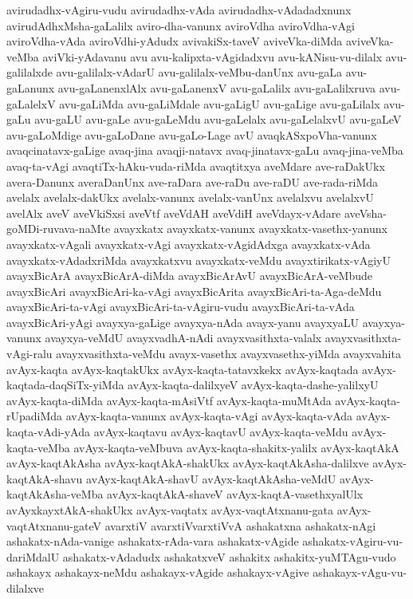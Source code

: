 {avirudadhx-vAgiru-vudu
avirudadhx-vAda
avirudadhx-vAdadadxnunx
avirudAdhxMsha-gaLalilx
aviro-dha-vanunx
aviroVdha
aviroVdha-vAgi
aviroVdha-vAda
aviroVdhi-yAdudx
avivakiSx-taveV
aviveVka-diMda
aviveVka-veMba
aviVki-yAdavanu
avu
avu-kalipxta-vAgidadxvu
avu-kANisu-vu-dilalx
avu-galilalxde
avu-galilalx-vAdarU
avu-galilalx-veMbu-danUnx
avu-gaLa
avu-gaLanunx
avu-gaLanenxlAlx
avu-gaLanenxV
avu-gaLalilx
avu-gaLalilxruva
avu-gaLalelxV
avu-gaLiMda
avu-gaLiMdale
avu-gaLigU
avu-gaLige
avu-gaLilalx
avu-gaLu
avu-gaLU
avu-gaLe
avu-gaLeMdu
avu-gaLelalx
avu-gaLelalxvU
avu-gaLeV
avu-gaLoMdige
avu-gaLoDane
avu-gaLo-Lage
avU
avaqkASxpoVha-vanunx
avaqcinatavx-gaLige
avaq-jina
avaqji-natavx
avaq-jinatavx-gaLu
avaq-jina-veMba
avaq-ta-vAgi
avaqtiTx-hAku-vuda-riMda
avaqtitxya
aveMdare
ave-raDakUkx
avera-Danunx
averaDanUnx
ave-raDara
ave-raDu
ave-raDU
ave-rada-riMda
avelalx
avelalx-dakUkx
avelalx-vanunx
avelalx-vanUnx
avelalxvu
avelalxvU
avelAlx
aveV
aveVkiSxsi
aveVtf
aveVdAH
aveVdiH
aveVdayx-vAdare
aveVsha-goMDi-ruvava-naMte
avayxkatx
avayxkatx-vanunx
avayxkatx-vasethx-yanunx
avayxkatx-vAgali
avayxkatx-vAgi
avayxkatx-vAgidAdxga
avayxkatx-vAda
avayxkatx-vAdadxriMda
avayxkatxvu
avayxkatx-veMdu
avayxtirikatx-vAgiyU
avayxBicArA
avayxBicArA-diMda
avayxBicArAvU
avayxBicArA-veMbude
avayxBicAri
avayxBicAri-ka-vAgi
avayxBicArita
avayxBicAri-ta-Aga-deMdu
avayxBicAri-ta-vAgi
avayxBicAri-ta-vAgiru-vudu
avayxBicAri-ta-vAda
avayxBicAri-yAgi
avayxya-gaLige
avayxya-nAda
avayx-yanu
avayxyaLU
avayxya-vanunx
avayxya-veMdU
avayxvadhA-nAdi
avayxvasithxta-valalx
avayxvasithxta-vAgi-ralu
avayxvasithxta-veMdu
avayx-vasethx
avayxvasethx-yiMda
avayxvahita
avAyx-kaqta
avAyx-kaqtakUkx
avAyx-kaqta-tatavxkekx
avAyx-kaqtada
avAyx-kaqtada-daqSiTx-yiMda
avAyx-kaqta-dalilxyeV
avAyx-kaqta-dashe-yalilxyU
avAyx-kaqta-diMda
avAyx-kaqta-mAsiVtf
avAyx-kaqta-muMtAda
avAyx-kaqta-rUpadiMda
avAyx-kaqta-vanunx
avAyx-kaqta-vAgi
avAyx-kaqta-vAda
avAyx-kaqta-vAdi-yAda
avAyx-kaqtavu
avAyx-kaqtavU
avAyx-kaqta-veMdu
avAyx-kaqta-veMba
avAyx-kaqta-veMbuva
avAyx-kaqta-shakitx-yalilx
avAyx-kaqtAkA
avAyx-kaqtAkAsha
avAyx-kaqtAkA-shakUkx
avAyx-kaqtAkAsha-dalilxve
avAyx-kaqtAkA-shavu
avAyx-kaqtAkA-shavU
avAyx-kaqtAkAsha-veMdU
avAyx-kaqtAkAsha-veMba
avAyx-kaqtAkA-shaveV
avAyx-kaqtA-vasethxyalUlx
avAyxkayxtAkA-shakUkx
avAyx-vaqtatx
avAyx-vaqtAtxnanu-gata
avAyx-vaqtAtxnanu-gateV
avarxtiV
avarxtiVvarxtiVvA
ashakatxna
ashakatx-nAgi
ashakatx-nAda-vanige
ashakatx-rAda-vara
ashakatx-vAgide
ashakatx-vAgiru-vu-dariMdalU
ashakatx-vAdadudx
ashakatxveV
ashakitx
ashakitx-yuMTAgu-vudo
ashakayx
ashakayx-neMdu
ashakayx-vAgide
ashakayx-vAgive
ashakayx-vAgu-vu-dilalxve
}
